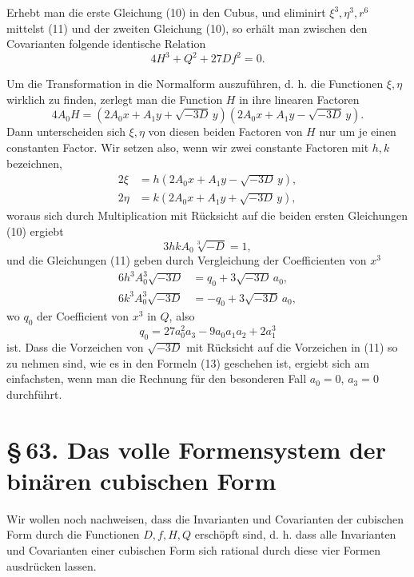 \documentclass[11pt]{article}
\providecommand{\sect}[2]{\section*{\S\,#1. #2}}
\begin{document}
Erhebt man die erste Gleichung (10) in den Cubus, und eliminirt $\xi^3,\eta^3,r^6$ mittelst (11) und der zweiten Gleichung (10), so erhält man zwischen den Covarianten folgende identische Relation
\begin{equation}
 4H^3+Q^2+27Df^2=0.
\tag{12}
\end{equation}

Um die Transformation in die Normalform auszuführen, d. h. die Functionen $\xi,\eta$ wirklich zu finden, zerlegt man die Function $H$ in ihre linearen Factoren
\[
 4A_0H=(2A_0x+A_1y+\sqrt{-3D}\,y)(2A_0x+A_1y-\sqrt{-3D}\,y).
\]
Dann unterscheiden sich $\xi,\eta$ von diesen beiden Factoren von $H$ nur um je einen constanten Factor. Wir setzen also, wenn wir zwei constante Factoren mit $h,k$ bezeichnen,
\begin{equation}
\begin{aligned}
 2\xi&=h(2A_0x+A_1y-\sqrt{-3D}\,y),\\
 2\eta&=k(2A_0x+A_1y+\sqrt{-3D}\,y),
\end{aligned}
\tag{13}
\end{equation}
woraus sich durch Multiplication mit Rücksicht auf die beiden ersten Gleichungen (10) ergiebt
\begin{equation}
 3hkA_0\sqrt[3]{-D}=1,
\tag{14}
\end{equation}
und die Gleichungen (11) geben durch Vergleichung der Coefficienten von $x^3$
\begin{equation}
\begin{aligned}
 6h^3A_0^3\sqrt{-3D}&= q_0+3\sqrt{-3D}\,a_0,\\
 6k^3A_0^3\sqrt{-3D}&=-q_0+3\sqrt{-3D}\,a_0,
\end{aligned}
\tag{15}
\end{equation}
wo $q_0$ der Coefficient von $x^3$ in $Q$, also
\begin{equation}
 q_0=27a_0^2a_3-9a_0a_1a_2+2a_1^3
\tag{16}
\end{equation}
ist. Dass die Vorzeichen von $\sqrt{-3D}$ mit Rücksicht auf die Vorzeichen in (11) so zu nehmen sind, wie es in den Formeln (13) geschehen ist, ergiebt sich am einfachsten, wenn man die Rechnung für den besonderen Fall $a_0=0$, $a_3=0$ durchführt.

\sect{63}{Das volle Formensystem der binären cubischen Form}

Wir wollen noch nachweisen, dass die Invarianten und Covarianten der cubischen Form durch die Functionen $D,f,H,Q$ erschöpft sind, d. h. dass alle Invarianten und Covarianten einer cubischen Form sich rational durch diese vier Formen ausdrücken lassen.
\end{document}
